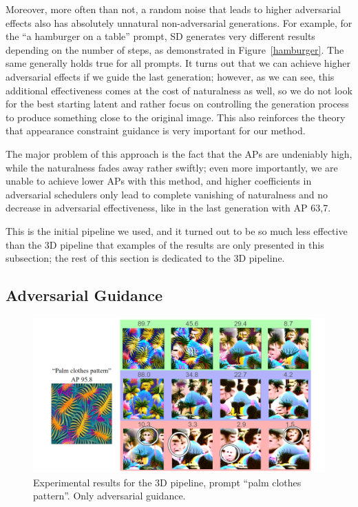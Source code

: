 Moreover, more often than not, a random noise that leads to higher adversarial effects also has absolutely unnatural non-adversarial generations.
For example, for the ``a hamburger on a table'' prompt, SD generates very different results depending on the number of steps, as demonstrated in Figure~\ref{hamburger}.
The same generally holds true for all prompts.
It turns out that we can achieve higher adversarial effects if we guide the last generation; however, as we can see, this additional effectiveness comes at the cost of naturalness as well, so we do not look for the best starting latent and rather focus on controlling the generation process to produce something close to the original image.
This also reinforces the theory that appearance constraint guidance is very important for our method.

The major problem of this approach is the fact that the APs are undeniably high, while the naturalness fades away rather swiftly; even more importantly, we are unable to achieve lower APs with this method, and higher coefficients in adversarial schedulers only lead to complete vanishing of naturalness and no decrease in adversarial effectiveness, like in the last generation with AP 63,7.

This is the initial pipeline we used, and it turned out to be so much less effective than the 3D pipeline that examples of the results are only presented in this subsection; the rest of this section is dedicated to the 3D pipeline.

\subsection{Adversarial Guidance}

\begin{figure}[htp]
\centering
\includegraphics[width=150mm]{figures/3d_res_wo_fix.png}
\caption{Experimental results for the 3D pipeline, prompt ``palm clothes pattern''. Only adversarial guidance.}
\label{3d_wo_fix}
\end{figure}


